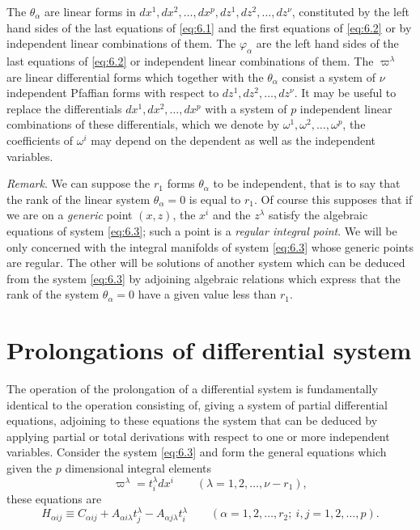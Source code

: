 The $\theta_{\alpha}$ are linear forms in $dx^{1},dx^{2},\dots,dx^{p},dz^{1},dz^{2},\dots,dz^{\nu}$, constituted by the left hand sides of the last equations of \eqref{eq:6.1} and the first equations of \eqref{eq:6.2} or by independent linear combinations of them. The $\varphi_{\alpha}$ are the left hand sides of the last equations of \eqref{eq:6.2} or independent linear combinations of them. The $\varpi^{\lambda}$ are  linear differential forms which together with the $\theta_{\alpha}$ consist a system of $\nu$ independent Pfaffian forms with respect to $dz^{1},dz^{2},\dots,dz^{\nu}$. It may be useful to replace the differentials $dx^{1},dx^{2},\dots,dx^{p}$ with a system of $p$ independent linear combinations of these differentials, which we denote by $\omega^{1},\omega^{2},\dots,\omega^{p}$, the coefficients of $\omega^{i}$ may depend on the dependent as well as the independent variables.



\vspace{12pt}\fsec \emph{Remark}. We can suppose the $r_{1}$  forms $\theta_{\alpha}$ to be independent, that is to say that the rank of the linear system $\theta_{\alpha}=0$ is equal to $r_{1}$. Of course this supposes that if we are on a \emph{generic} point $(x,z)$, the $x^{i}$ and the $z^{\lambda}$ satisfy the algebraic equations of system \eqref{eq:6.3}; such a point is a \emph{regular integral point}. We will be only concerned with the integral manifolds of system \eqref{eq:6.3} whose generic points are regular. The other will be solutions of another system which can be deduced from the system \eqref{eq:6.3} by adjoining algebraic relations which express that the rank of the system $\theta_{\alpha}=0$ have a given value less than $r_{1}$.


\section{Prolongations of differential system}
\label{sec:prol-diff-syst}

\fsec The operation of the prolongation of a differential system is fundamentally identical to the operation consisting of, giving a system of partial differential equations, adjoining to these equations the system that can be deduced by applying partial or total derivations with respect to one or more independent variables. Consider the system \eqref{eq:6.3} and form the general equations which given the $p$ dimensional integral elements
\begin{equation}
  \label{eq:6.4}
  \varpi^{\lambda}=t_{i}^{\lambda}dx^{i}\qquad(\lambda=1,2,\dots,\nu-r_{1}),
\end{equation}
these equations are
\begin{equation}
  \label{eq:6.5}
  H_{\alpha ij}\equiv C_{\alpha ij}+A_{\alpha i\lambda}t_{j}^{\lambda}-A_{\alpha j\lambda}t_{i}^{\lambda}\qquad(\alpha=1,2,\dots,r_{2};\ i,j=1,2,\dots,p).
\end{equation}

